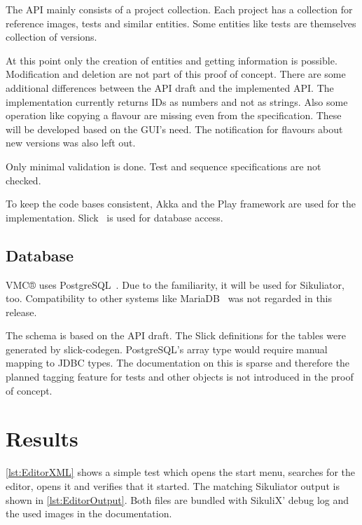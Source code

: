 \documentclass[a4paper,twocolumn,twoside]{article}
\newcommand{\VMC}[0]{VMC®}
\newcommand{\Sik}[0]{Sikuliator}
\begin{document}
The API mainly consists of a project collection.
Each project has a collection for reference images, tests and similar entities.
Some entities like tests are themselves collection of versions.

At this point only the creation of entities and getting information is possible.
Modification and deletion are not part of this proof of concept.
There are some additional differences between the API draft and the implemented API.
The implementation currently returns IDs as numbers and not as strings.
Also some operation like copying a flavour are missing even from the specification.
These will be developed based on the GUI's need.
The notification for flavours about new versions was also left out.

Only minimal validation is done.
Test and sequence specifications are not checked.

To keep the code bases consistent, Akka and the Play framework are used for the implementation.
Slick~\cite{Slick} is used for database access.

\subsection{Database}
\VMC{} uses PostgreSQL~\cite{PostgreSQL}.
Due to the familiarity, it will be used for \Sik{}, too.
Compatibility to other systems like MariaDB~\cite{MariaDB} was not regarded in this release.

The schema is based on the API draft.
The Slick definitions for the tables were generated by slick-codegen.
PostgreSQL's array type would require manual mapping to JDBC types.
The documentation on this is sparse and therefore the planned tagging feature for tests and other objects is not introduced in the proof of concept.


\section{Results}

\autoref{lst:EditorXML} shows a simple test which opens the start menu, searches for the editor, opens it and verifies that it started. 
The matching Sikuliator output is shown in \autoref{lst:EditorOutput}.
Both files are bundled with SikuliX' debug log and the used images in the documentation.
\end{document}
